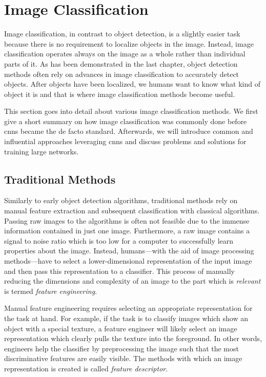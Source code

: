 \documentclass[draft,final]{vutinfth} %
\begin{document}
\section{Image Classification}
\label{sec:background-classification}

Image classification, in contrast to object detection, is a slightly
easier task because there is no requirement to localize objects in the
image. Instead, image classification operates always on the image as a
whole rather than individual parts of it. As has been demonstrated in
the last chapter, object detection methods often rely on advances in
image classification to accurately detect objects. After objects have
been localized, we humans want to know what kind of object it is and
that is where image classification methods become useful.

This section goes into detail about various image classification
methods. We first give a short summary on how image classification was
commonly done before \glspl{cnn} became the de facto
standard. Afterwards, we will introduce common and influential
approaches leveraging \glspl{cnn} and discuss problems and solutions
for training large networks.

\subsection{Traditional Methods}
\label{ssec:class-traditional}

Similarly to early object detection algorithms, traditional methods
rely on manual feature extraction and subsequent classification with
classical algorithms. Passing raw images to the algorithms is often
not feasible due to the immense information contained in just one
image. Furthermore, a raw image contains a signal to noise ratio which
is too low for a computer to successfully learn properties about the
image. Instead, humans—with the aid of image processing methods—have
to select a lower-dimensional representation of the input image and
then pass this representation to a classifier. This process of
manually reducing the dimensions and complexity of an image to the
part which is \emph{relevant} is termed \emph{feature engineering}.

Manual feature engineering requires selecting an appropriate
representation for the task at hand. For example, if the task is to
classify images which show an object with a special texture, a feature
engineer will likely select an image representation which clearly
pulls the texture into the foreground. In other words, engineers help
the classifier by preprocessing the image such that the most
discriminative features are easily visible. The methods with which an
image representation is created is called \emph{feature descriptor}.
\end{document}
